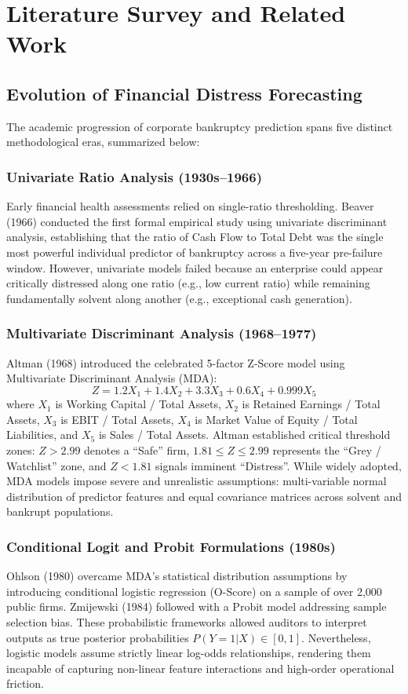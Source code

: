 \documentclass[11pt, a4paper]{article}
\begin{document}
\section{Literature Survey and Related Work}

\subsection{Evolution of Financial Distress Forecasting}
The academic progression of corporate bankruptcy prediction spans five distinct methodological eras, summarized below:

\subsubsection{Univariate Ratio Analysis (1930s--1966)}
Early financial health assessments relied on single-ratio thresholding. Beaver (1966) conducted the first formal empirical study using univariate discriminant analysis, establishing that the ratio of Cash Flow to Total Debt was the single most powerful individual predictor of bankruptcy across a five-year pre-failure window. However, univariate models failed because an enterprise could appear critically distressed along one ratio (e.g., low current ratio) while remaining fundamentally solvent along another (e.g., exceptional cash generation).

\subsubsection{Multivariate Discriminant Analysis (1968--1977)}
Altman (1968) introduced the celebrated 5-factor Z-Score model using Multivariate Discriminant Analysis (MDA):
\begin{equation}
    Z = 1.2 X_1 + 1.4 X_2 + 3.3 X_3 + 0.6 X_4 + 0.999 X_5
\end{equation}
where $X_1$ is Working Capital / Total Assets, $X_2$ is Retained Earnings / Total Assets, $X_3$ is EBIT / Total Assets, $X_4$ is Market Value of Equity / Total Liabilities, and $X_5$ is Sales / Total Assets. Altman established critical threshold zones: $Z > 2.99$ denotes a ``Safe'' firm, $1.81 \le Z \le 2.99$ represents the ``Grey / Watchlist'' zone, and $Z < 1.81$ signals imminent ``Distress''. While widely adopted, MDA models impose severe and unrealistic assumptions: multi-variable normal distribution of predictor features and equal covariance matrices across solvent and bankrupt populations.

\subsubsection{Conditional Logit and Probit Formulations (1980s)}
Ohlson (1980) overcame MDA's statistical distribution assumptions by introducing conditional logistic regression (O-Score) on a sample of over 2,000 public firms. Zmijewski (1984) followed with a Probit model addressing sample selection bias. These probabilistic frameworks allowed auditors to interpret outputs as true posterior probabilities $P(Y=1|X) \in [0, 1]$. Nevertheless, logistic models assume strictly linear log-odds relationships, rendering them incapable of capturing non-linear feature interactions and high-order operational friction.
\end{document}
